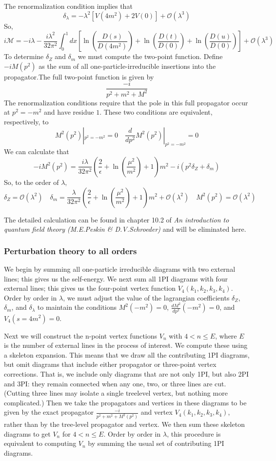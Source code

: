 The renormalization condition implies that
\[\delta_{\lambda} = -\lambda^2[V(4m^2)+2V(0)] + \mathcal{O}(\lambda^3)\]
So,
\[i\mathcal{M} = -i\lambda -\frac{i\lambda^2}{32\pi^2} \int_0^1 dx \left[\ln(\frac{D(s)}{D(4m^2)}) +\ln(\frac{D(t)}{D(0)})+\ln(\frac{D(u)}{D(0)})\right] + \mathcal{O}(\lambda^3)\]
To determine $\delta_Z$ and $\delta_m$ we must compute the two-point function. Define $-iM(p^2)$ as the sum of all one-particle-irreducible insertions into the propagator.The full two-point function is given by
\[\frac{-i}{p^2 + m^2 + M^2}\]
The renormalization conditions require that the pole in this full propagator occur at $p^2=-m^2$ and have residue $1$. These two conditions are equivalent, respectively, to
\[M^2(p^2)|_{p^2=-m^2} = 0 \quad \frac{d}{dp^2} M^2(p^2)|_{p^2=-m^2} =0\]
We can calculate that
\[-iM^2(p^2) = \frac{i\lambda}{32\pi^2}(\frac{2}{\epsilon} + \ln(\frac{\mu^2}{m^2})+1)m^2 -i(p^2\delta_Z + \delta_m)\]
So, to the order of $\lambda$, 
\[\delta_Z=\mathcal{O}(\lambda^2) \quad \delta_m = \frac{\lambda}{32\pi^2}(\frac{2}{\epsilon} + \ln(\frac{\mu^2}{m^2})+1)m^2 + \mathcal{O}(\lambda^2) \quad M^2(p^2) =\mathcal{O}(\lambda^2)\]

The detailed calculation can be found in chapter 10.2 of \emph{An introduction to quantum field theory (M.E.Peskin \& D.V.Schroeder)} and will be eliminated here.

\subsubsection{Perturbation theory to all orders}
We begin by summing all one-particle irreducible diagrams with two
external lines; this gives us the self-energy. We next sum all 1PI
diagrams with four external lines; this gives us the four-point vertex function $V_4(k_1, k_2, k_3, k_4)$. Order by order in $\lambda$, we must adjust the value of the lagrangian coefficients $\delta_Z$, $\delta_m$, and $\delta_{\lambda}$ to maintain the conditions $M^2(-m^2) = 0$, $\frac{dM^2}{dp^2}(-m^2) = 0$, and $V_4(s=4m^2) =0$. 

Next we will construct the n-point vertex functions $V_n$ with $4 < n \leq E$, where $E$ is the number of external lines in the process of interest. We compute these using a skeleton expansion. This means that we draw all the contributing 1PI diagrams, but omit diagrams that include either propagator or three-point vertex corrections. That is, we include only diagrams that are not only 1PI, but also 2PI and 3PI: they remain connected when any one, two, or three lines are cut. (Cutting three lines may isolate a single treelevel vertex, but nothing more complicated.) Then we take the propagators and vertices in these diagrams to be given by the exact propagator $\frac{-i}{p^2+m^2+M^2(p^2)}$ and vertex $V_4(k_1,k_2,k_3,k_4)$, rather than by the tree-level propagator and vertex. We then sum these skeleton diagrams to get $V_n$ for $4 < n \leq E$. Order by order in $\lambda$, this procedure is
equivalent to computing $V_n$ by summing the usual set of contributing 1PI diagrams.

